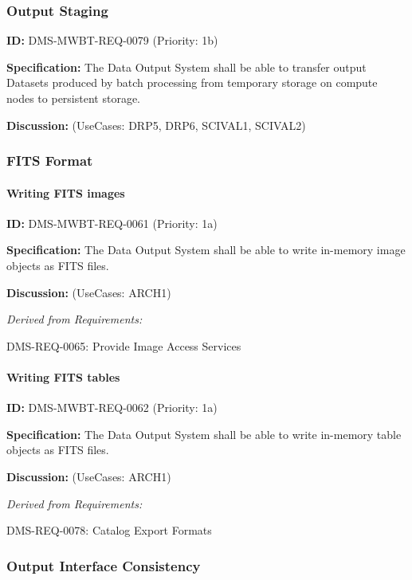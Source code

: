 \documentclass[SE,toc,lsstdraft]{lsstdoc}
\begin{document}
\subsubsection{Output Staging}

\label{DMS-MWBT-REQ-0079}
\textbf{ID:} DMS-MWBT-REQ-0079 (Priority: 1b)

\textbf{Specification:}
The Data Output System shall be able to transfer output Datasets produced by batch processing from temporary storage on compute nodes to persistent storage.

\textbf{Discussion:}
(UseCases: DRP5, DRP6, SCIVAL1, SCIVAL2)

\subsubsection{FITS Format}

\paragraph{Writing FITS images}\hfill  %

\label{DMS-MWBT-REQ-0061}
\textbf{ID:} DMS-MWBT-REQ-0061 (Priority: 1a)

\textbf{Specification:}
The Data Output System shall be able to write in-memory image objects as FITS files.

\textbf{Discussion:}
(UseCases: ARCH1)

\emph{Derived from Requirements:}

DMS-REQ-0065:
Provide Image Access Services \newline

\paragraph{Writing FITS tables}\hfill  %

\label{DMS-MWBT-REQ-0062}
\textbf{ID:} DMS-MWBT-REQ-0062 (Priority: 1a)

\textbf{Specification:}
The Data Output System shall be able to write in-memory table objects as FITS files.

\textbf{Discussion:}
(UseCases: ARCH1)

\emph{Derived from Requirements:}

DMS-REQ-0078:
Catalog Export Formats \newline

\subsubsection{Output Interface Consistency}
\end{document}
